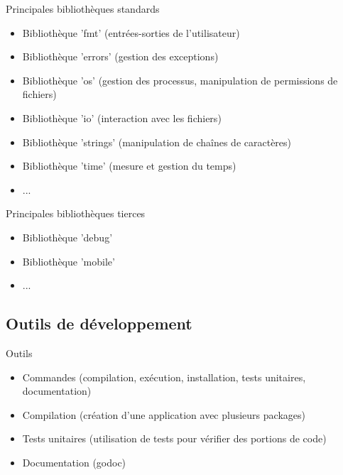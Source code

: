 \documentclass{beamer}
\begin{document}
\begin{frame}
\begin{block}{Principales bibliothèques standards} 
	\begin{itemize}
		[circle]
		\item Bibliothèque 'fmt' (entrées-sorties de l'utilisateur)
		\item Bibliothèque 'errors' (gestion des exceptions)
		\item Bibliothèque 'os' (gestion des processus, manipulation de permissions de fichiers)
		\item Bibliothèque 'io' (interaction avec les fichiers)
		\item Bibliothèque 'strings' (manipulation de chaînes de caractères)
		\item Bibliothèque 'time' (mesure et gestion du temps)
		\item ...
	\end{itemize}
\end{block}

\begin{block}{Principales bibliothèques tierces} 
	\begin{itemize}
		[circle]
		\item Bibliothèque 'debug'
		\item Bibliothèque 'mobile'
		\item ...
	\end{itemize}
\end{block}
\end{frame}

\subsection{Outils de développement}

\begin{frame}
\begin{block}{Outils}
	\begin{itemize}
		[circle]
		\item Commandes (compilation, exécution, installation, tests unitaires, documentation)
		\item Compilation (création d'une application avec plusieurs packages)
		\item Tests unitaires (utilisation de tests pour vérifier des portions de code)
		\item Documentation (godoc)
		
	\end{itemize}
\end{block}
\end{frame}
\end{document}

